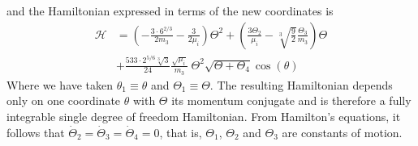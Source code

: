 \documentclass[twoside,openright,titlepage,numbers=noenddot,headinclude,%
                footinclude=true,cleardoublepage=empty,abstractoff, 
                BCOR=5mm,paper=a4,fontsize=11pt,%
                american,%
                ]{scrreprt}%
\begin{document}
and the Hamiltonian expressed in terms of the new coordinates is 
\begin{equation}
    \begin{aligned}
        \mathcal{H}&=\left(- \frac{3\cdot 6^{2/3}}{2m_3} - \frac{3}{2\mu_i} 
        \right)\Theta^2+
        \left(\frac{3\Theta_2 }{\mu_i}
          -\sqrt[3]{\frac{9}{2}}\frac{\Theta_3}{m_3}
        \right)\Theta\\ 
        &+ \frac{533\cdot 2^{5/6}\sqrt[3]{3}}{24} 
        \frac{\sqrt{\mu_i}}{m_3}\;  \Theta^2\sqrt{\Theta+\Theta_4}\cos(\theta)
    \end{aligned}
    \label{eq:hamiltonian_sdof_full}
\end{equation}
Where we have taken $\theta_1\equiv\theta$ and $\Theta_1\equiv\Theta$.
The resulting Hamiltonian depends only on one coordinate $\theta$ with
$\Theta$ its momentum conjugate and 
is therefore a fully integrable single degree of freedom Hamiltonian. 
From Hamilton's equations, it follows that 
$\dot{\Theta}_2=\dot{\Theta}_3=\dot{\Theta}_4=0$, that is, $\Theta_1$,
$\Theta_2$  and $\Theta_3$ are constants of motion. 
\end{document}

